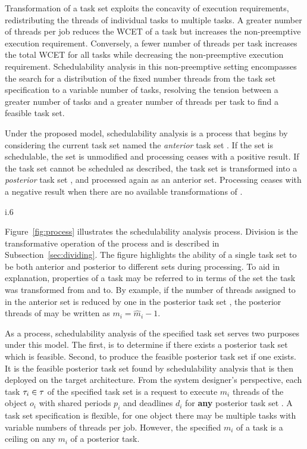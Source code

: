 Transformation of a task set exploits the concavity of execution
requirements, redistributing the threads of individual tasks to
multiple tasks. A greater number of threads per job reduces the WCET
of a task but increases the non-preemptive execution
requirement. Conversely, a fewer number of threads per task increases
the total WCET for all tasks while decreasing the non-preemptive
execution requirement. Schedulability analysis in this non-preemptive
setting  encompasses the search for a distribution of the fixed number
threads from the task set specification to a variable number of tasks,
resolving the tension between a greater number of tasks and a
greater number of threads per task to find a feasible task set. 
 
Under the proposed model, schedulability analysis is a process that
begins by considering the current task set named the \emph{anterior}
task set \supts{}. If the set is schedulable, the set is unmodified and
processing ceases with a positive result. If the task set \supts{}
cannot be scheduled as described, the task set is transformed into a
\emph{posterior} task set \tasks{}, and processed again as an anterior
set. Processing ceases with a negative result when there are no
available transformations of \supts{}.

\begin{wrapfigure}{i}{.6\linewidth}
  \centering
  
  \caption{Schedulability and Transformable Task Sets}
  \label{fig:process}
\end{wrapfigure}

Figure~\ref{fig:process} illustrates the schedulability analysis
process. Division is the transformative operation of the process and
is described in Subsection~\ref{sec:dividing}. The figure highlights the
ability of a single task set to be both anterior and posterior to
different sets during processing. To aid in explanation, properties of a
task may be referred to in terms of the set the task was transformed
from and to. By example, if the number of threads assigned to 
in the anterior set \supts{} is reduced by one in the posterior task
set \tasks{}, the posterior threads of  may be written as
${m_i = \hat{m}_i - 1}$.

As a process, schedulability analysis of the specified task set serves
two purposes under this model. The first, is to determine if there exists a
posterior task set which is feasible. Second, to produce the feasible
posterior task set if one exists. It is the feasible posterior task
set \tasks{} found by schedulability analysis that is then
deployed on the target architecture. From the system designer's
perspective, each task ${\tau_{i} \in \tau{}}$ of the specified
task set is a request to execute ${m_i}$ threads of the object ${o_i}$
with shared periods ${p_i}$ and deadlines ${d_i}$ for \textbf{any}
posterior task set \tasks{}. A task set specification is flexible,
for one object there may be multiple tasks with variable numbers of
threads per job. However, the specified ${m_i}$ of a task is a ceiling
on any ${m_i}$ of a posterior task. 

